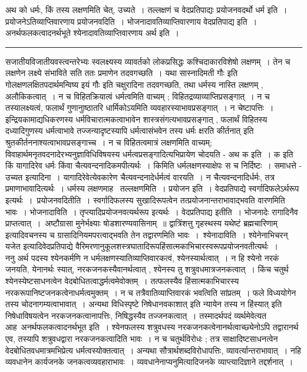 \documentclass[11pt, openany]{book}
\begin{document}
{\bl अथ को धर्मः, किं तस्य लक्षणमिति चेत्, उच्यते~। तल्लक्षणं च वेदप्रतिपाद्यः प्रयोजनवदर्थो धर्म इति~। प्रयोजनेऽतिव्याप्तिवारणाय प्रयोजनवदिति~। भोजनादावतिव्याप्तिवारणाय वेदप्रतिपाद्य इति~। अनर्थफलकत्वादनर्थभूते श्येनादावतिव्याप्तिवारणाय अर्थ
इति~।}\\
\hrule
\vspace{3mm}
\noindent
सजातीयविजातीयवस्त्वन्तरेभ्यः स्वलक्ष्यस्य व्यावर्तको लोकप्रसिद्धः कश्चिदाकारविशेषो लक्षणम्~। तेन च लक्षणेन लक्ष्ये संभाविते सति ततः प्रमाणेन तदवगच्छति~। यथा {\qt सास्नादिमती गौः} इति गोलक्षणलक्षितपदार्थमन्विष्य {\qt इयं गौः} इति चक्षुरादिना तदवगच्छति, तथा धर्मस्य नास्ति लक्षणम् , अलौकिकत्वात्~। न च विहितक्रियात्वं धर्मत्वमिति वाच्यम् ; विहितद्रव्याव्याप्तिप्रसङ्गात्~। न च तस्यालक्ष्यत्वं, फलार्थं गुणानुाष्ठातरि धार्मिकोऽयमिति व्यवहारस्याभावप्रसङ्गात्~। न चेष्टापत्तिः~। इन्द्रियकामाद्यधिकरणस्य धर्मविचारात्मकत्वाभावेन शास्त्रसंगत्यभावप्रसङ्गात् , फलार्थं विहितस्य दध्यादिगुणस्य धर्मत्वाभावे तज्जन्यादृष्टस्यापि धर्मत्वासंभवेन तस्य {\qt धर्मः क्षरति कीर्तनात्} इति श्रुतकीर्तननाश्यत्वाभावप्रसङ्गाच्च~। न च विहितत्वमात्रं लक्षणमिति वाच्यम्; विवाहार्थमनृतवदनादेरभ्यनुज्ञाविधिविषयस्य धर्मत्वप्रसङ्गादित्यभिप्रायेण
चोदयति - {\br अथ क इति~।} क इति किं यागादिरेव धर्मः किंवा चैत्यवन्दनादिकमपीत्यर्थः~। किमिति धर्मलक्षणस्याक्षेपः स च निर्दिष्टः~। समाधत्ते - {\br उच्यत इत्यादिना~।} यागादिरेवेत्येवकारेण चैत्यवन्दनादेर्धर्मत्वं वारयति~। न चैत्यवन्दनादिर्धर्मः, तत्र प्रमाणाभावादित्यर्थः~। धर्मस्य लक्षणमाह \textendash\ {\br तल्लक्षणमिति~। प्रयोजन इति~।} वेदप्रतिपाद्ये स्वर्गादिफलेऽर्थरूप इत्यर्थः~।~{\br प्रयोजनवदितीति~।} स्वर्गादिफलस्य सुखादिरूपत्वेन तत्प्रयोजनान्तराभावाद्भवति वारणमिति भावः~। {\br भोजनादाविति~।} तृप्त्यादिप्रयोजनवत्यर्थरूप इत्यर्थः~। {\br वेदप्रतिपाद्य इतीति~।} भोजनादेः रागादिनैव प्राप्तत्वात्~।~{\qt अष्टौग्रासा मुनेर्भक्ष्याः षोडशारण्यवासिनाम्~॥ द्वात्रिंशत्तु गृहस्थस्य यथेष्टं ब्रह्मचारिणाम्} इत्यादिवचनस्य च ग्रासादिनियमपरत्वाद्भवति तेन तद्वारणमिति भावः~।~{\br श्येनादाविति~।}
\newpage
\fancyhead[LO]{प्रश्नः ]}
\noindent
{\qt श्येनेनाभिचरन् यजेत} इत्यादिवेदप्रतिपाद्ये वैरिमरणानुकूलशस्त्रघातादिरूपहिंसात्मकाभिचारस्वरूपप्रयोजनवतीत्यर्थः~।~\\

 {\br ननु} {\qt अर्थ} पदस्य श्येनकर्मणि न धर्मलक्षणस्यातिव्याप्तिवारकत्वं, श्येनस्यार्थत्वात्~। न हि श्येनो नरकं जनयति, येनानर्थः स्यात्, नरकजनकस्यैवानर्थत्वात् , श्येनस्य तु शत्रुवधमात्रजनकत्वात्~। किंच चतुर्थ श्येनस्येष्टसाधनत्वेन वेदबोधितत्वाद्धर्मत्वमेवोक्तम्~। तत्फलस्यैव हिंसात्मकाभिचारस्य नरकरूपानिष्टजनकत्वेनाधर्मत्वमुक्तम्~। न च तत्रैवातिव्याप्तिवारकं भवत्विति सांप्रतम्~। फले विध्ययोगेन तस्य चोदनागम्यत्वाभावात्~। अन्यथा {\qt विधिस्पृष्टे निषेधानवकाशात्} इति न्यायेन तस्य {\qt न हिंस्यात्} इति निषेधाविषयत्वेन नरकजनकत्वानापत्तिः, निषिद्धस्यैव तज्जनकत्वात्~। तस्मादर्थपदं व्यर्थमेवेत्यत आह\textendash\ {\br अनर्थफलकत्वादनर्थभूत इति~।} श्येनफलस्य शत्रुवधस्य नरकजनकत्वेनानर्थत्वाच्छ्येनोऽपि तद्वारानर्थ एव, तस्यापि शत्रुवधद्वारा नरकजनकत्वादिति भावः~। न च चतुर्थविरोधः ; तत्र साक्षादिष्टसाधनत्वेन वेदबोधितवधमात्रमभिप्रेत्य धर्मत्वस्योक्तत्वात्~। अन्यथा सौत्रार्थशब्दविरोधापत्तिः,
व्यावर्त्यान्तराभावात्~। नहि व्यवधानेन कार्यजनके जनकत्वव्यवहाराभावः~। व्यवधानेनाप्यनुमित्यादिजनके व्याप्त्यादिज्ञाने तद्दर्शनात्~।~\\
\end{document}
